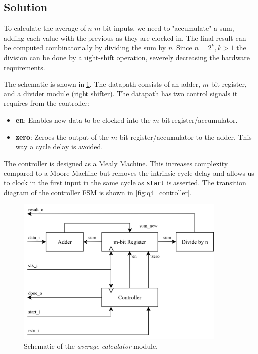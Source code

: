 \documentclass[../main.tex]{subfiles}
\begin{document}
\subsection*{Solution}

To calculate the average of $n$ $m$-bit inputs, we need to "accumulate" a sum, adding each value with the previous as they are clocked in. The final result can be computed combinatorially by dividing the sum by $n$. Since $n = 2^k, k > 1$ the division can be done by a right-shift operation, severely decreasing the hardware requirements.

The schematic is shown in \cref{fig:q4}. The datapath consists of an adder, $m$-bit register, and a divider module (right shifter). The datapath has two control signals it requires from the controller:

\begin{itemize}
    \item \textbf{en}: Enables new data to be clocked into the $m$-bit register/accumulator.
    \item \textbf{zero}: Zeroes the output of the $m$-bit register/accumulator to the adder. This way a cycle delay is avoided. 
\end{itemize}

The controller is designed as a Mealy Machine. This increases complexity compared to a Moore Machine but removes the intrinsic cycle delay and allows us to clock in the first input in the same cycle as \lstinline{start} is asserted. The transition diagram of the controller FSM is shown in \cref{fig:q4_controller}.

\newpage

\begin{figure}[H]
    \centering
    \includegraphics[width=0.9\textwidth]{assets/q4.png}
    \caption{Schematic of the \textit{average calculator} module.}
    \label{fig:q4}
\end{figure}
\end{document}
